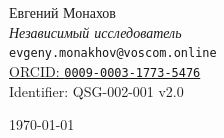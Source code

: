 \documentclass{article}
\numberwithin{equation}{section}
\theoremstyle{plain}
\theoremstyle{definition}
\theoremstyle{remark}
\begin{document}
\begin{titlepage}
		{\large Евгений Монахов}\\[6pt]
		{\itshape Независимый исследователь}\\[2pt]
		\texttt{evgeny.monakhov@voscom.online}\\[2pt]
		\href{https://orcid.org/0009-0003-1773-5476}{ORCID: \texttt{0009-0003-1773-5476}}\\[30pt]
		
		{\footnotesize Identifier: QSG-002-001 v2.0}\\[6pt]
		
		\vspace*{\fill}
		
		{\large \today}
		
	\end{titlepage}

\clearpage
\tableofcontents

\clearpage
\end{document}
